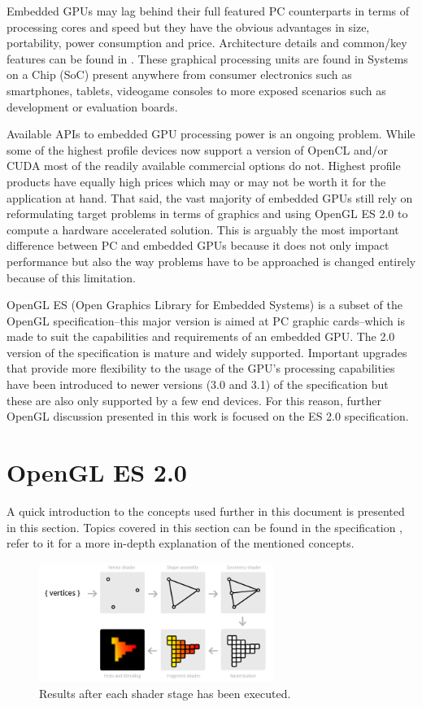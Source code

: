 \documentclass[conference]{IEEEtran}
\begin{document}
Embedded GPUs may lag behind their full featured PC counterparts in terms of processing cores and speed but they have the obvious advantages in size, portability, power consumption and price. Architecture details and common/key features can be found in \cite{singhal12}. These graphical processing units are found in Systems on a Chip (SoC) present anywhere from consumer electronics such as smartphones, tablets, videogame consoles to more exposed scenarios such as development or evaluation boards.

Available APIs to embedded GPU processing power is an ongoing problem. While some of the highest profile devices now support a version of OpenCL and/or CUDA most of the readily available commercial options do not. Highest profile products have equally high prices which may or may not be worth it for the application at hand. That said, the vast majority of embedded GPUs still rely on reformulating target problems in terms of graphics and using OpenGL ES 2.0 to compute a hardware accelerated solution. This is arguably the most important difference between PC and embedded GPUs because it does not only impact performance but also the way problems have to be approached is changed entirely because of this limitation.

OpenGL ES (Open Graphics Library for Embedded Systems) is a subset of the OpenGL specification--this major version is aimed at PC graphic cards--which is made to suit the capabilities and requirements of an embedded GPU. The 2.0 version of the specification is mature and widely supported. Important upgrades that provide more flexibility to the usage of the GPU's processing capabilities have been introduced to newer versions (3.0 and 3.1) of the specification but these are also only supported by a few end devices. For this reason, further OpenGL discussion presented in this work is focused on the ES 2.0 specification.


\section{OpenGL ES 2.0} %
A quick introduction to the concepts used further in this document is presented in this section. Topics covered in this section can be found in the specification \cite{opengles2}, refer to it for a more in-depth explanation of the mentioned concepts. %

\begin{figure}[!t]
 \centering
 \includegraphics[width=3.0in]{shader_work}
 \caption{Results after each shader stage has been executed.}
 \label{fig:shader_work}
\end{figure}
\end{document}
